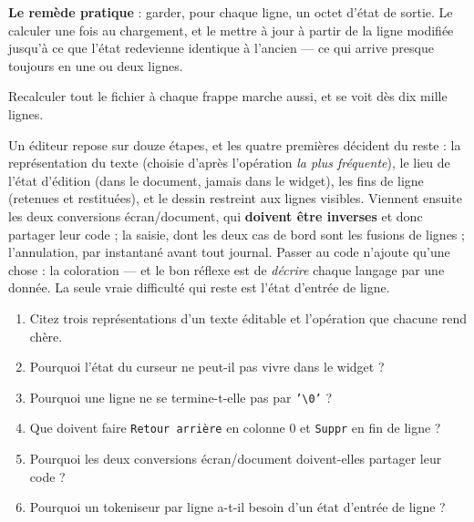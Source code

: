 \begin{nkretenir}
\textbf{Le remède pratique} : garder, pour chaque ligne, un octet d'état de
sortie. Le calculer une fois au chargement, et le mettre à jour à partir de la
ligne modifiée jusqu'à ce que l'état redevienne identique à l'ancien --- ce qui
arrive presque toujours en une ou deux lignes.

Recalculer tout le fichier à chaque frappe marche aussi, et se voit dès dix mille
lignes.
\end{nkretenir}

\begin{nkbilan}
Un éditeur repose sur douze étapes, et les quatre premières décident du reste :
la représentation du texte (choisie d'après l'opération \emph{la plus fréquente}),
le lieu de l'état d'édition (dans le document, jamais dans le widget), les fins
de ligne (retenues et restituées), et le dessin restreint aux lignes visibles.
Viennent ensuite les deux conversions écran/document, qui \textbf{doivent être
inverses} et donc partager leur code ; la saisie, dont les deux cas de bord sont
les fusions de lignes ; l'annulation, par instantané avant tout journal. Passer
au code n'ajoute qu'une chose : la coloration --- et le bon réflexe est de
\emph{décrire} chaque langage par une donnée. La seule vraie difficulté qui reste
est l'état d'entrée de ligne.
\end{nkbilan}

\begin{nkquestions}
\begin{enumerate}
\item Citez trois représentations d'un texte éditable et l'opération que chacune
      rend chère.
\item Pourquoi l'état du curseur ne peut-il pas vivre dans le widget ?
\item Pourquoi une ligne ne se termine-t-elle pas par
      \texttt{'\textbackslash 0'} ?
\item Que doivent faire \texttt{Retour arrière} en colonne 0 et \texttt{Suppr}
      en fin de ligne ?
\item Pourquoi les deux conversions écran/document doivent-elles partager leur
      code ?
\item Pourquoi un tokeniseur par ligne a-t-il besoin d'un état d'entrée de
      ligne ?
\end{enumerate}
\end{nkquestions}

